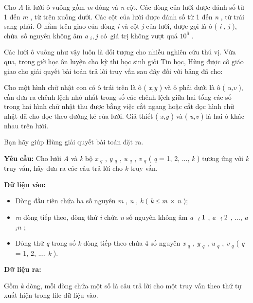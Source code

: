 

Cho \emph{ A } là lưới ô vuông gồm \emph{ m } dòng và \emph{ n } cột. Các dòng của lưới được đánh số từ 1 đến \emph{ m } , từ trên xuống dưới. Các cột của lưới được đánh số từ 1 đến \emph{ n } , từ trái sang phải. Ô nằm trên giao của dòng \emph{ i } và cột \emph{ j } của lưới, được gọi là ô ( \emph{ i } , \emph{ j } ), chứa số nguyên không âm \emph{ a }\emph{$_ i,j $} có giá trị không vượt quá $10^{6}$ .

Các lưới ô vuông như vậy luôn là đối tượng cho nhiều nghiên cứu thú vị. Vừa qua, trong giờ học ôn luyện cho kỳ thi học sinh giỏi Tin học, Hùng được cô giáo giao cho giải quyết bài toán trả lời truy vấn sau đây đối với bảng đã cho:

Cho một hình chữ nhật con có ô trái trên là ô ( \emph{ x,y } ) và ô phải dưới là ô ( \emph{ u,v } ), cần đưa ra chênh lệch nhỏ nhất trong số các chênh lệch giữa hai tổng các số trong hai hình chữ nhật thu được bằng việc cắt ngang hoặc cắt dọc hình chữ nhật đã cho dọc theo đường kẻ của lưới. Giả thiết ( \emph{ x,y } ) và ( \emph{ u,v } ) là hai ô khác nhau trên lưới.

Bạn hãy giúp Hùng giải quyết bài toán đặt ra.

\textbf{Yêu }\textbf{}\textbf{ cầu: }\textbf{} Cho lưới \emph{ A } và \emph{ k } bộ \emph{ x }\emph{$_ q $} , \emph{ y }\emph{$_ q $}\emph{} , \emph{ u }\emph{$_ q $} , \emph{ v }\emph{$_ q $}\emph{} ( \emph{ q }\emph{} = 1, 2, ..., \emph{ k } ) tương ứng với \emph{ k } truy vấn, hãy đưa ra các câu trả lời cho \emph{ k } truy vấn.

\textbf{Dữ liệu vào: }
\begin{itemize}
	\item Dòng đầu tiên chứa ba số nguyên \emph{ m } , \emph{ n } , \emph{ k } ( \emph{ k } ≤ \emph{ m } × \emph{ n } );
	\item \emph{m } dòng tiếp theo, dòng thứ \emph{ i } chứa \emph{ n } số nguyên không âm \emph{ a }$_\emph{ i } 1 $ , \emph{ a }$_\emph{ i } 2 $ , ..., \emph{ a }\emph{$_ in $} ;
	\item Dòng thứ \emph{ q } trong số \emph{ k } dòng tiếp theo chứa 4 số nguyên \emph{ x }\emph{$_ q $} , \emph{ y }\emph{$_ q $} , \emph{ u }\emph{$_ q $} , \emph{ v }\emph{$_ q $}\emph{} ( \emph{ q }\emph{} = 1, 2, ..., \emph{ k } ).
\end{itemize}

\textbf{Dữ liệu ra: }

Gồm \emph{ k } dòng, mỗi dòng chứa một số là câu trả lời cho một truy vấn theo thứ tự xuất hiện trong file dữ liệu vào.

